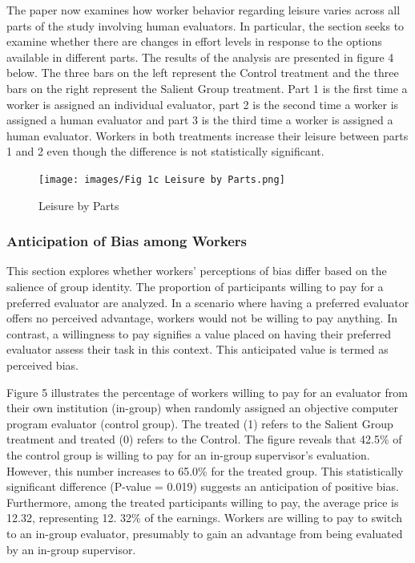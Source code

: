 The paper now examines how worker behavior regarding leisure varies across all parts of the study involving human evaluators. In particular, the section seeks to examine whether there are changes in effort levels in response to the options available in different parts. The results of the analysis are presented in figure 4 below. The three bars on the left represent the Control treatment and the three bars on the right represent the Salient Group treatment. Part 1 is the first time a worker is assigned an individual evaluator, part 2 is the second time a worker is assigned a human evaluator and part 3 is the third time a worker is assigned a human evaluator. Workers in both treatments increase their leisure between parts 1 and 2 even though the difference is not statistically significant.  

\begin{figure}[H]
 \captionsetup{justification=raggedright,singlelinecheck=false}
\caption{Leisure by Parts}
\texttt{[image: images/Fig 1c Leisure by Parts.png]} 
\end{figure}
\subsubsection{Anticipation of Bias among Workers}

This section explores whether workers' perceptions of bias differ based on the salience of group identity. The proportion of participants willing to pay for a preferred evaluator are analyzed. In a scenario where having a preferred evaluator offers no perceived advantage, workers would not be willing to pay anything. In contrast, a willingness to pay signifies a value placed on having their preferred evaluator assess their task in this context. This anticipated value is termed as perceived bias.

Figure 5 illustrates the percentage of workers willing to pay for an evaluator from their own institution (in-group) when randomly assigned an objective computer program evaluator (control group). The treated (1) refers to the Salient Group treatment and treated (0) refers to the Control. The figure reveals that 42.5\% of the control group is willing to pay for an in-group supervisor's evaluation. However, this number increases to 65.0\% for the treated group. This statistically significant difference (P-value = 0.019) suggests an anticipation of positive bias. Furthermore, among the treated participants willing to pay, the average price is 12.32, representing 12. 32\% of the earnings. Workers are willing to pay to switch to an in-group evaluator, presumably to gain an advantage from being evaluated by an in-group supervisor.

